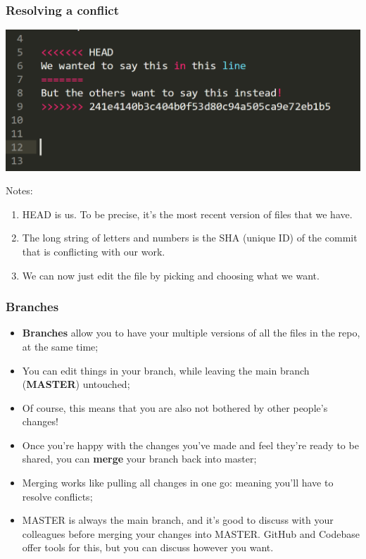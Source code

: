 \documentclass{beamer}
\begin{document}
\begin{frame}
	\frametitle{Resolving a conflict}
	\hfill\includegraphics[width=0.8\linewidth]{figures/conflict.png}\hfill\strut
	Notes:
	\begin{enumerate}
		\item HEAD is us. To be precise, it's the most recent version of files that we have.
		\item The long string of letters and numbers is the SHA (unique ID) of the commit that is conflicting with our work.
		\item We can now just edit the file by picking and choosing what we want.
	\end{enumerate}
\end{frame}


\begin{frame}
	\frametitle{Branches}
	\begin{itemize}
		\item \textbf{Branches} allow you to have your multiple versions of all the files in the repo, at the same time;
		\item You can edit things in your branch, while leaving the main branch (\textbf{MASTER}) untouched;
		\item Of course, this means that you are also not bothered by other people's changes!
		\item Once you're happy with the changes you've made and feel they're ready to be shared, you can \textbf{merge} your branch back into master;
		\item Merging works like pulling all changes in one go: meaning you'll have to resolve conflicts;
		\item MASTER is always the main branch, and it's good to discuss with your colleagues before merging your changes into MASTER. GitHub and Codebase offer tools for this, but you can discuss however you want.
	\end{itemize}
\end{frame}
\end{document}
